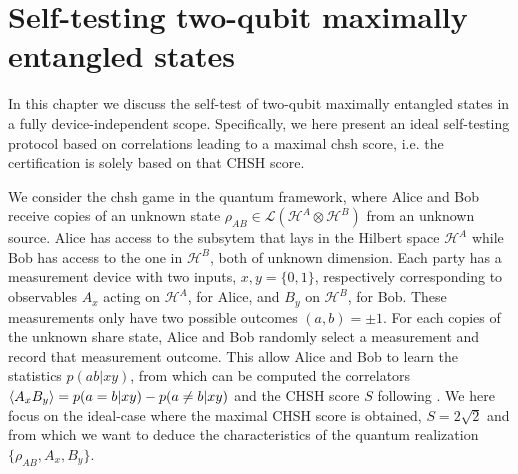 \chapter{Self-testing two-qubit maximally entangled states}
\label{chap:selftesting}

In this chapter we discuss the self-test of two-qubit maximally entangled states in a fully device-independent scope.
Specifically, we here present an ideal self-testing protocol based on correlations leading to a maximal \acrshort{chsh} score, i.e. the certification is solely based on that CHSH score.

\medbreak 

We consider the \acrshort{chsh} game in the quantum framework, where Alice and Bob receive copies of an unknown state $\rho_{AB} \in \mathcal{L}(\mathscr{H}^A \otimes \mathscr{H}^B)$ from an unknown source.
Alice has access to the subsytem that lays in the Hilbert space $\mathscr{H}^A$ while Bob has access to the one in $\mathscr{H}^B$, both of unknown dimension.
Each party has a measurement device with two inputs, $x,y=\{0,1\}$, respectively corresponding to observables $A_x$ acting on $\mathscr{H}^A$, for Alice, and $B_y$ on $\mathscr{H}^B$, for Bob.
These measurements only have two possible outcomes $(a,b)=\pm1$.
For each copies of the unknown share state, Alice and Bob randomly select a measurement and record that measurement outcome. 
This allow Alice and Bob to learn the statistics $p(ab|xy)$, from which can be computed the correlators $\langle {A_x B_y} \rangle = p(a=b|xy)-p(a\neq b| xy)$ and the CHSH score $S$ following . 
We here focus on the ideal-case where the maximal CHSH score is obtained, $S=2\sqrt{2}$ and from which we want to deduce the characteristics of the quantum realization $\{\rho_{AB},A_x,B_y\}$.

\medbreak

